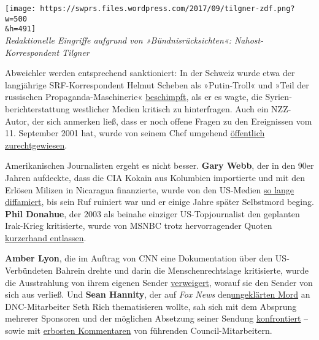 \texttt{[image: https://swprs.files.wordpress.com/2017/09/tilgner-zdf.png?w=500\\\&h=491]}\\
\emph{Re­dak­tio­nelle Ein­­griffe aufgrund von
»Bünd­nis­rück­sich­ten«: Nahost-Korrespondent Tilgner}

Abweichler werden entsprechend sanktioniert: In der Schweiz wurde etwa
der langjährige SRF-Korrespondent Helmut Scheben als »Putin-Troll« und
»Teil der russischen Propaganda-Maschinerie«
\href{https://swprs.org/das-gewuenschte-narrativ-ii/}{beschimpft}, als
er es wagte, die Syrien­bericht­erstattung westlicher Medien kritisch zu
hinterfragen. Auch ein NZZ-Autor, der sich anmerken ließ, dass er noch
offene Fragen zu den Ereignissen vom 11. September 2001 hat, wurde von
seinem Chef umgehend
\href{https://swprs.org/anschlag-auf-die-forschungsfreiheit/}{öffentlich
zurechtgewiesen}.

Amerikanischen Journalisten ergeht es nicht besser. \textbf{Gary Webb},
der in den 90er Jahren aufdeckte, dass die CIA Kokain aus Kolumbien
importierte und mit den Erlösen Milizen in Nicaragua finanzierte, wurde
von den US-Medien
\href{https://consortiumnews.com/2014/11/02/gary-webb-and-media-manipulation/}{so
lange diffamiert}, bis sein Ruf ruiniert war und er einige Jahre später
Selbstmord beging. \textbf{Phil Donahue}, der 2003 als beinahe einziger
US-Topjournalist den geplanten Irak-Krieg kritisierte, wurde von MSNBC
trotz hervorragender Quoten
\href{https://www.democracynow.org/2013/3/21/phil_donahue_on_his_2003_firing}{kurzerhand
entlassen}.

\textbf{Amber Lyon}, die im Auftrag von CNN eine Dokumentation über den
US-Verbündeten Bahrein drehte und darin die Menschenrechtslage
kritisierte, wurde die Ausstrahlung von ihrem eigenen Sender
\href{https://www.theguardian.com/world/2012/sep/04/cnn-international-documentary-bahrain-arab-spring-repression}{verweigert},
worauf sie den Sender von sich aus verließ. Und \textbf{Sean Hannity},
der auf \emph{Fox News}
den\href{http://www.globalresearch.ca/the-case-of-seth-richs-assassination-will-it-expose-the-truth-behind-the-russia-elections-hacking-narrative/5593866}{ungeklärten
Mord} an DNC-Mitarbeiter Seth Rich thematisieren wollte, sah sich mit
dem Absprung mehrerer Sponsoren und der möglichen Absetzung seiner
Sendung
\href{https://www.theguardian.com/media/2017/may/26/sean-hannity-advertiser-boycott-fox-news-seth-rich}{konfrontiert}
-- sowie mit
\href{http://foreignpolicy.com/2017/05/22/the-seth-rich-scandal-shows-that-fox-news-is-morally-bankrupt/}{erbosten
Kommentaren} von führenden Council-Mitarbeitern.

